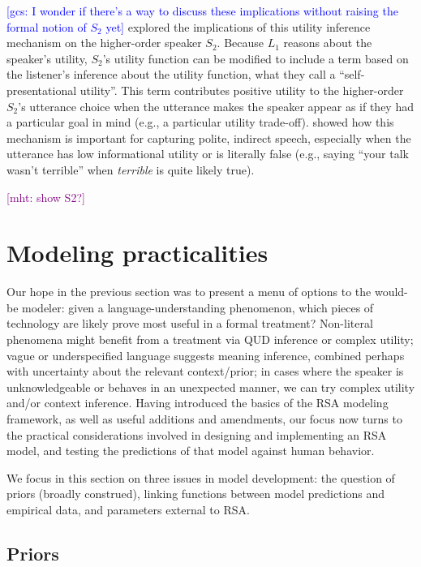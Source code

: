 \documentclass{sp}
\newcommand{\gcs}[1]{\textcolor{blue}{[gcs: #1]}}
\newcommand{\mht}[1]{\textcolor{purple}{[mht: #1]}}
\begin{document}
\gcs{I wonder if there's a way to discuss these implications without raising the formal notion of $S_2$ yet} \cite{yoonetal2017, yoonetal2018} explored the implications of this utility inference mechanism on the higher-order speaker $S_2$. Because $L_1$ reasons about the speaker's utility, $S_2$'s utility function can be modified to include a term based on the listener's inference about the utility function, what they call a ``self-presentational utility''. This term contributes positive utility to the higher-order $S_2$'s utterance choice when the utterance makes the speaker appear as if they had a particular goal in mind (e.g., a particular utility trade-off). \cite{yoonetal2018} showed how this mechanism is important for capturing polite, indirect speech, especially when the utterance has low informational utility or is literally false (e.g., saying ``your talk wasn't terrible'' when \emph{terrible} is quite likely true). 

\mht{show S2?}


\section{Modeling practicalities} \label{practicalities}

Our hope in the previous section was to present a menu of options to the would-be modeler: given a language-understanding phenomenon, which pieces of technology are likely prove most useful in a formal treatment? Non-literal phenomena might benefit from a treatment via QUD inference or complex utility; vague or underspecified language suggests meaning inference, combined perhaps with uncertainty about the relevant context/prior; in cases where the speaker is unknowledgeable or behaves in an unexpected manner, we can try complex utility and/or context inference. Having introduced the basics of the RSA modeling framework, as well as useful additions and amendments, our focus now turns to the practical considerations involved in designing and implementing an RSA model, and testing the predictions of that model against human behavior. 

We focus in this section on three issues in model development: the question of priors (broadly construed), linking functions between model predictions and empirical data, and parameters external to RSA. 

\subsection{Priors}
 
\end{document}
